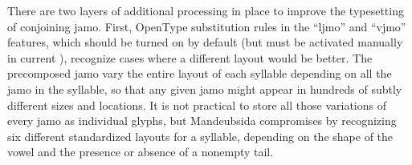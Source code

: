 \documentclass[14pt]{extarticle}
\begin{document}
There are two layers of additional processing in place to improve the
typesetting of conjoining jamo.  First, OpenType substitution rules in the
``ljmo'' and ``vjmo'' features, which should be turned on by default (but
must be activated manually in current \XeTeX), recognize cases where a
different layout would be better. The precomposed jamo vary the entire
layout of each syllable depending on all the jamo in the syllable, so that
any given jamo might appear in hundreds of subtly different sizes and
locations.  It is not practical to store all those variations of every jamo
as individual glyphs, but Mandeubsida compromises by recognizing six different
standardized layouts for a syllable, depending on the shape of the vowel and
the presence or absence of a nonempty tail.

{\hspace*{\fill}\hspace*{\fill}\par}
\end{document}
